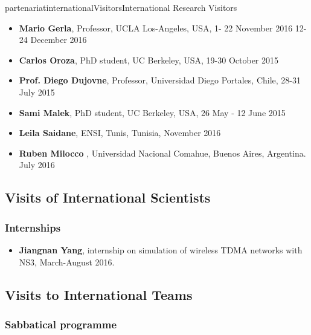 \documentclass{ra2016}
\begin{document}
\begin{module}{partenariat}{internationalVisitors}{International Research Visitors}
\begin{itemize}
     \item{\bf Mario Gerla}, Professor, UCLA Los-Angeles, USA, 1- 22 November 2016  12-24 December 2016
    \item{\bf Carlos Oroza}, PhD student, UC Berkeley, USA, 19-30 October 2015
    \item{\bf Prof. Diego Dujovne}, Professor, Universidad Diego Portales, Chile, 28-31 July 2015
    \item{\bf Sami Malek}, PhD student, UC Berkeley, USA, 26 May - 12 June 2015
    \item{\bf Leila Saidane}, ENSI, Tunis, Tunisia, November 2016 
    \item{\bf Ruben Milocco }, Universidad Nacional Comahue, Buenos Aires, Argentina. July  2016
\end{itemize}
\subsection{Visits of International Scientists}

   \subsubsection{Internships}

\begin{itemize}
    \item{\bf Jiangnan Yang}, internship on simulation of wireless TDMA networks with NS3, March-August 2016.
\end{itemize}



\subsection{Visits to International Teams}
   \subsubsection{Sabbatical programme}


\end{module}
\end{document}
